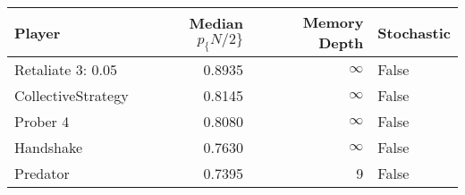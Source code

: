 \begin{tabular}{lrrl}
\toprule
             Player &  Median $p_\{N/2\}$ &  Memory Depth & Stochastic \\
\midrule
  Retaliate 3: 0.05 &            0.8935 &            \(\infty\) &      False \\
 CollectiveStrategy &            0.8145 &            \(\infty\) &      False \\
           Prober 4 &            0.8080 &            \(\infty\) &      False \\
          Handshake &            0.7630 &            \(\infty\) &      False \\
           Predator &            0.7395 &             9 &      False \\
\bottomrule
\end{tabular}
